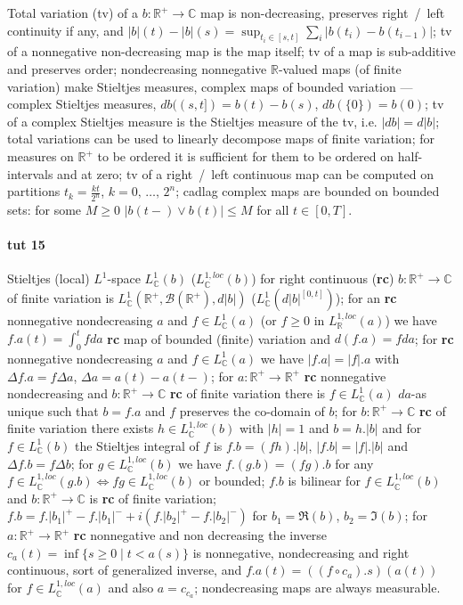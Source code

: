 \documentclass[a4paper]{article}
\newcommand{\Bcal}{\mathcal{B}}
\newcommand{\real}{\mathbb{R}}
\newcommand{\cplx}{\mathbb{C}}
\begin{document}
Total variation (tv) of a $b\colon \real^+ \to \cplx$ map is non-decreasing, preserves
right~/~left continuity if any, and
$|b|(t) - |b|(s) = \sup_{t_i \in [s, t]} \sum_i |b(t_i) - b(t_{i-1})|$;
%
tv of a nonnegative non-decreasing map is the map itself;
%
tv of a map is sub-additive and preserves order;
%
nondecreasing nonnegative $\real$-valued maps (of finite variation) make Stieltjes
measures, complex maps of bounded variation --- complex Stieltjes measures,
$db((s,t]) = b(t) - b(s)$, $db(\{0\}) = b(0)$;
%
tv of a complex Stieltjes measure is the Stieltjes measure of the tv, i.e. $|db| = d|b|$;
%
total variations can be used to linearly decompose maps of finite variation;
%
for measures on $\real^+$ to be ordered it is sufficient for them to be ordered on
half-intervals and at zero;
%
tv of a right~/~left continuous map can be computed on partitions
$t_k = \tfrac{k t}{2^n}$, $k=0,\, \ldots,\,2^n$;
%
cadlag complex maps are bounded on bounded sets: for some $M\geq 0$
$|b(t-) \vee b(t)| \leq M$ for all $t \in [0, T]$.



\paragraph{tut 15} %
\label{par:tut_15}

Stieltjes (local) $L^1$-space $L^1_\cplx(b)$ ($L^{1,loc}_\cplx(b)$) for right continuous
({\bf rc}) $b\colon \real^+ \to \cplx$ of finite variation is
$L_\cplx^1(\real^+, \Bcal(\real^+), d|b|)$ ($L_\cplx^1(d|b|^{[0,t]})$);
%
for an {\bf rc} nonnegative nondecreasing $a$ and $f \in L^1_\cplx(a)$ (or $f \geq 0$ in
$L^{1,loc}_\real(a)$) we have $f.a(t) = \int_0^t f da$ {\bf rc} map of bounded (finite)
variation and $d(f.a) = f da$;
%
for {\bf rc} nonnegative nondecreasing $a$ and $f \in L^1_\cplx(a)$ we have
$|f.a| = |f|.a$ with $\Delta f.a = f\Delta a$, $\Delta a = a(t) - a(t-)$;
%
for $a\colon \real^+ \to \real^+$ {\bf rc} nonnegative nondecreasing and
$b\colon \real^+ \to \cplx$ {\bf rc} of finite variation there is $f \in L^1_\cplx(a)$
$da$-as unique such that $b = f.a$ and $f$ preserves the co-domain of $b$;
%
for $b\colon \real^+ \to \cplx$ {\bf rc} of finite variation there exists
$h \in L^{1,loc}_\cplx(b)$ with $|h|=1$ and $b = h.|b|$ and for $f \in L^1_\cplx(b)$
the Stieltjes integral of $f$ is $f.b = (f h).|b|$, $|f.b| = |f|.|b|$ and
$\Delta f.b = f \Delta b$;
%
for $g \in L^{1,loc}_\cplx(b)$ we have $f.(g.b) = (fg).b$ for any
$f \in L^{1,loc}_\cplx(g.b) \Leftrightarrow fg \in L^{1,loc}_\cplx(b)$ or bounded;
%
$f.b$ is bilinear for $f \in L^{1,loc}_\cplx(b)$ and $b\colon \real^+ \to \cplx$
is {\bf rc} of finite variation;
%
$f.b = f.|b_1|^+ - f.|b_1|^- + i(f.|b_2|^+ - f.|b_2|^-)$ for $b_1 = \Re(b)$, $b_2 = \Im(b)$;
%
for $a\colon \real^+ \to \real^+$ {\bf rc} nonnegative and non decreasing the inverse
$c_a(t) = \inf\{s \geq 0 \mid t < a(s) \}$ is nonnegative, nondecreasing and right
continuous, sort of generalized inverse, and $f.a(t) = ((f \circ c_a).s)(a(t))$ for
$f \in L^{1,loc}_\cplx(a)$ and also $a = c_{c_a}$;
%
nondecreasing maps are always measurable.
\end{document}
